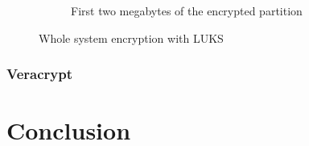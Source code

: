 \documentclass[
  digital, %
  oneside, %
  lof,     %
  lot,     %
]{fithesis4}
\begin{document}
\begin{figure}
\begin{subfigure}[t]{.45\textwidth}
    \caption{First two megabytes of the encrypted partition}
    \label{fig:idk2-enc}
  \end{subfigure}
  \caption{Whole system encryption with LUKS}
  \label{fig:idk2}
\end{figure}

\subsection{Veracrypt}

\chapter{Conclusion}










\end{document}
